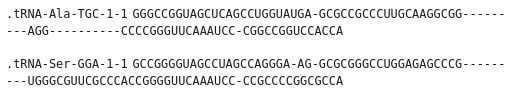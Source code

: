 \documentclass{article}
\newcommand{\rnabox}[1]{\colorbox{#1}{\texttt{#1}}}
\begin{document}
\vspace{-0.5mm}

\texttt{.tRNA-Ala-TGC-1-1}
\rnabox{G}\rnabox{G}\rnabox{G}\rnabox{C}\rnabox{C}\rnabox{G}\rnabox{G}\rnabox{U}\rnabox{A}\rnabox{G}\rnabox{C}\rnabox{U}\rnabox{C}\rnabox{A}\rnabox{G}\rnabox{C}\rnabox{C}\rnabox{U}\rnabox{G}\rnabox{G}\rnabox{U}\rnabox{A}\rnabox{U}\rnabox{G}\rnabox{A}\rnabox{-}\rnabox{G}\rnabox{C}\rnabox{G}\rnabox{C}\rnabox{C}\rnabox{G}\rnabox{C}\rnabox{C}\rnabox{C}\rnabox{U}\rnabox{U}\rnabox{G}\rnabox{C}\rnabox{A}\rnabox{A}\rnabox{G}\rnabox{G}\rnabox{C}\rnabox{G}\rnabox{G}\rnabox{-}\rnabox{-}\rnabox{-}\rnabox{-}\rnabox{-}\rnabox{-}\rnabox{-}\rnabox{-}\rnabox{-}\rnabox{A}\rnabox{G}\rnabox{G}\rnabox{-}\rnabox{-}\rnabox{-}\rnabox{-}\rnabox{-}\rnabox{-}\rnabox{-}\rnabox{-}\rnabox{-}\rnabox{-}\rnabox{C}\rnabox{C}\rnabox{C}\rnabox{C}\rnabox{G}\rnabox{G}\rnabox{G}\rnabox{U}\rnabox{U}\rnabox{C}\rnabox{A}\rnabox{A}\rnabox{A}\rnabox{U}\rnabox{C}\rnabox{C}\rnabox{-}\rnabox{C}\rnabox{G}\rnabox{G}\rnabox{C}\rnabox{C}\rnabox{G}\rnabox{G}\rnabox{U}\rnabox{C}\rnabox{C}\rnabox{A}\rnabox{C}\rnabox{C}\rnabox{A}

\vspace{-0.5mm}

\texttt{.tRNA-Ser-GGA-1-1}
\rnabox{G}\rnabox{C}\rnabox{C}\rnabox{G}\rnabox{G}\rnabox{G}\rnabox{G}\rnabox{U}\rnabox{A}\rnabox{G}\rnabox{C}\rnabox{C}\rnabox{U}\rnabox{A}\rnabox{G}\rnabox{C}\rnabox{C}\rnabox{A}\rnabox{G}\rnabox{G}\rnabox{G}\rnabox{A}\rnabox{-}\rnabox{A}\rnabox{G}\rnabox{-}\rnabox{G}\rnabox{C}\rnabox{G}\rnabox{C}\rnabox{G}\rnabox{G}\rnabox{G}\rnabox{C}\rnabox{C}\rnabox{U}\rnabox{G}\rnabox{G}\rnabox{A}\rnabox{G}\rnabox{A}\rnabox{G}\rnabox{C}\rnabox{C}\rnabox{C}\rnabox{G}\rnabox{-}\rnabox{-}\rnabox{-}\rnabox{-}\rnabox{-}\rnabox{-}\rnabox{-}\rnabox{-}\rnabox{-}\rnabox{U}\rnabox{G}\rnabox{G}\rnabox{G}\rnabox{C}\rnabox{G}\rnabox{U}\rnabox{U}\rnabox{C}\rnabox{G}\rnabox{C}\rnabox{C}\rnabox{C}\rnabox{A}\rnabox{C}\rnabox{C}\rnabox{G}\rnabox{G}\rnabox{G}\rnabox{G}\rnabox{U}\rnabox{U}\rnabox{C}\rnabox{A}\rnabox{A}\rnabox{A}\rnabox{U}\rnabox{C}\rnabox{C}\rnabox{-}\rnabox{C}\rnabox{C}\rnabox{G}\rnabox{C}\rnabox{C}\rnabox{C}\rnabox{C}\rnabox{G}\rnabox{G}\rnabox{C}\rnabox{G}\rnabox{C}\rnabox{C}\rnabox{A}

\vspace{-0.5mm}
\end{document}
